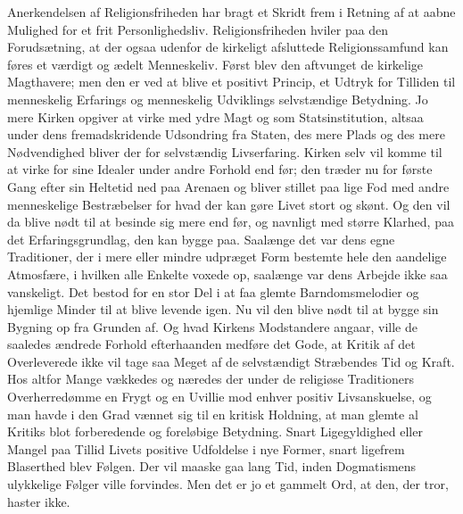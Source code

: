 \documentclass[12pt,a4paper]{article}
\newcommand{\opage}[1]{\marginnote{\footnotesize\textit{[#1]}}}
\begin{document}
Anerkendelsen af Religionsfriheden har bragt et Skridt frem i Retning af at
aabne Mulighed for et frit Personlighedsliv. Religionsfriheden hviler paa den
Forudsætning, at der ogsaa udenfor de kirkeligt afsluttede Religionssamfund kan
føres et værdigt og ædelt Menneskeliv. Først blev den aftvunget de kirkelige
Magthavere; men den er ved at blive et positivt Princip, et Udtryk for Tilliden
til menneskelig Erfarings og menneskelig Udviklings selvstændige Betydning. Jo
mere Kirken opgiver at virke med ydre Magt og som Statsinstitution, altsaa under
dens fremadskridende Udsondring fra Staten, des mere Plads og des mere
Nødvendighed bliver der for selvstændig Livserfaring. Kirken selv vil komme til
at virke for sine Idealer under andre Forhold end før; den træder nu for første
Gang efter sin Heltetid ned paa Arenaen og bliver stillet paa lige Fod med andre
menneskelige Bestræbelser for hvad der kan gøre Livet stort og skønt. Og den vil
da blive nødt til at besinde \opage{58} sig mere end før, og navnligt med større Klarhed,
paa det Erfaringsgrundlag, den kan bygge paa. Saalænge det var dens egne
Traditioner, der i mere eller mindre udpræget Form bestemte hele den aandelige
Atmosfære, i hvilken alle Enkelte voxede op, saalænge var dens Arbejde ikke saa
vanskeligt. Det bestod for en stor Del i at faa glemte Barndomsmelodier og
hjemlige Minder til at blive levende igen. Nu vil den blive nødt til at bygge sin
Bygning op fra Grunden af. Og hvad Kirkens Modstandere angaar, ville de saaledes
ændrede Forhold efterhaanden medføre det Gode, at Kritik af det Overleverede
ikke vil tage saa Meget af de selvstændigt Stræbendes Tid og Kraft. Hos altfor
Mange vækkedes og næredes der under de religiøse Traditioners Overherredømme en
Frygt og en Uvillie mod enhver positiv Livsanskuelse, og man havde i den Grad
vænnet sig til en kritisk Holdning, at man glemte al Kritiks blot forberedende og
foreløbige Betydning. Snart Ligegyldighed eller Mangel paa Tillid Livets
positive Udfoldelse i nye Former, snart ligefrem Blaserthed blev Følgen. Der vil
maaske gaa lang Tid, inden Dogmatismens ulykkelige Følger ville forvindes. Men
det er jo et gammelt Ord, at den, der tror, haster ikke.
\end{document}
